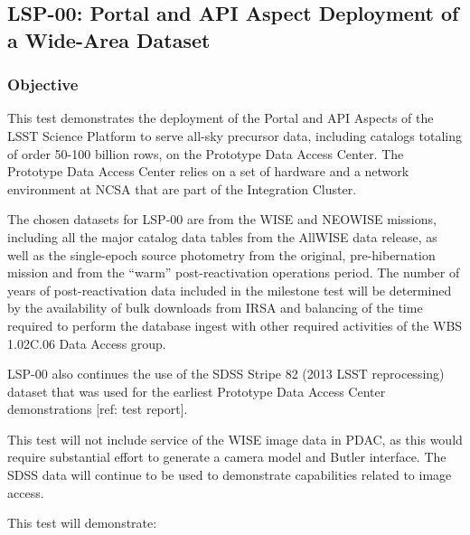 \subsection{LSP-00: Portal and API Aspect Deployment of a Wide-Area Dataset}
\label{lsp-00}

\subsubsection{Objective}

This test demonstrates the deployment of the Portal and API Aspects of the LSST Science Platform to serve all-sky precursor data, including catalogs totaling of order 50-100 billion rows, on the Prototype Data Access Center.
The Prototype Data Access Center relies on a set of hardware and a network environment at NCSA that are part of the Integration Cluster.

The chosen datasets for LSP-00 are from the WISE and NEOWISE missions, 
including all the major catalog data tables from the AllWISE data release, 
as well as the single-epoch source photometry from the original, pre-hibernation mission and from the ``warm'' post-reactivation operations period.
The number of years of post-reactivation data included in the milestone test will be determined by the availability of bulk downloads from IRSA and balancing of the time required to perform the database ingest with other required activities of the WBS 1.02C.06 Data Access group.

LSP-00 also continues the use of the SDSS Stripe 82 (2013 LSST reprocessing) dataset that was used for the earliest Prototype Data Access Center demonstrations [ref: test report].

This test will not include service of the WISE image data in PDAC, as this would require substantial effort to generate a camera model and Butler interface.  
The SDSS data will continue to be used to demonstrate capabilities related to image access.

This test will demonstrate:


